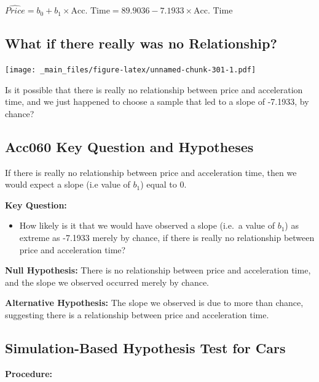\documentclass[]{book}
\providecommand{\tightlist}{%
  \setlength{\itemsep}{0pt}\setlength{\parskip}{0pt}}
\begin{document}
\(\widehat{Price} = b_0+b_1\times \text{Acc. Time} =89.9036 -7.1933\times\text{Acc. Time}\)

\subsection{What if there really was no
Relationship?}\label{what-if-there-really-was-no-relationship}

\texttt{[image: \_main\_files/figure-latex/unnamed-chunk-301-1.pdf]}

Is it possible that there is really no relationship between price and
acceleration time, and we just happened to choose a sample that led to a
slope of -7.1933, by chance?

\subsection{Acc060 Key Question and
Hypotheses}\label{acc060-key-question-and-hypotheses}

If there is really no relationship between price and acceleration time,
then we would expect a slope (i.e value of \(b_1\)) equal to 0.

\textbf{Key Question:}

\begin{itemize}
\tightlist
\item
  How likely is it that we would have observed a slope (i.e.~a value of
  \(b_1\)) as extreme as -7.1933 merely by chance, if there is really no
  relationship between price and acceleration time?
\end{itemize}

\textbf{Null Hypothesis:} There is no relationship between price and
acceleration time, and the slope we observed occurred merely by chance.

\textbf{Alternative Hypothesis:} The slope we observed is due to more
than chance, suggesting there is a relationship between price and
acceleration time.

\subsection{Simulation-Based Hypothesis Test for
Cars}\label{simulation-based-hypothesis-test-for-cars}

\textbf{Procedure:}
\end{document}
